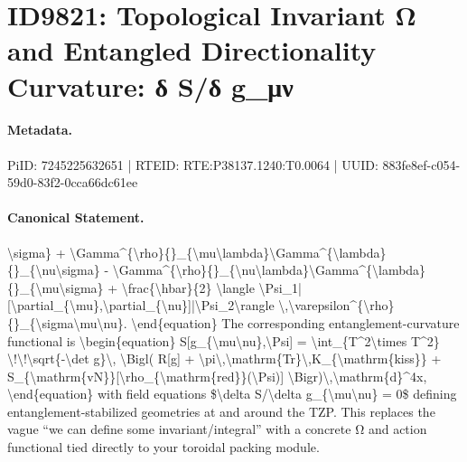 \section*{ID9821: Topological Invariant Ω and Entangled Directionality Curvature: δ S/δ g\_μν}
\paragraph{Metadata.}
PiID: 7245225632651 | RTEID: RTE:P38137.1240:T0.0064 | UUID: 883fe8ef-c054-59d0-83f2-0cca66dc61ee

\paragraph{Canonical Statement.}
\textbackslash{}sigma\} + \textbackslash{}Gamma\textasciicircum{}\{\textbackslash{}rho\}\{\}\_\{\textbackslash{}mu\textbackslash{}lambda\}\textbackslash{}Gamma\textasciicircum{}\{\textbackslash{}lambda\}\{\}\_\{\textbackslash{}nu\textbackslash{}sigma\} - \textbackslash{}Gamma\textasciicircum{}\{\textbackslash{}rho\}\{\}\_\{\textbackslash{}nu\textbackslash{}lambda\}\textbackslash{}Gamma\textasciicircum{}\{\textbackslash{}lambda\}\{\}\_\{\textbackslash{}mu\textbackslash{}sigma\} + \textbackslash{}frac\{\textbackslash{}hbar\}\{2\} \textbackslash{}langle \textbackslash{}Psi\_1|[\textbackslash{}partial\_\{\textbackslash{}mu\},\textbackslash{}partial\_\{\textbackslash{}nu\}]|\textbackslash{}Psi\_2\textbackslash{}rangle \textbackslash{},\textbackslash{}varepsilon\textasciicircum{}\{\textbackslash{}rho\}\{\}\_\{\textbackslash{}sigma\textbackslash{}mu\textbackslash{}nu\}. \textbackslash{}end\{equation\} The corresponding entanglement-curvature functional is \textbackslash{}begin\{equation\} S[g\_\{\textbackslash{}mu\textbackslash{}nu\},\textbackslash{}Psi] = \textbackslash{}int\_\{T\textasciicircum{}2\textbackslash{}times T\textasciicircum{}2\} \textbackslash{}!\textbackslash{}!\textbackslash{}sqrt\{-\textbackslash{}det g\}\textbackslash{}, \textbackslash{}Bigl( R[g] + \textbackslash{}pi\textbackslash{},\textbackslash{}mathrm\{Tr\}\textbackslash{},K\_\{\textbackslash{}mathrm\{kiss\}\} + S\_\{\textbackslash{}mathrm\{vN\}\}[\textbackslash{}rho\_\{\textbackslash{}mathrm\{red\}\}(\textbackslash{}Psi)] \textbackslash{}Bigr)\textbackslash{},\textbackslash{}mathrm\{d\}\textasciicircum{}4x, \textbackslash{}end\{equation\} with field equations \$\textbackslash{}delta S/\textbackslash{}delta g\_\{\textbackslash{}mu\textbackslash{}nu\} = 0\$ defining entanglement-stabilized geometries at and around the TZP. This replaces the vague “we can define some invariant/integral” with a concrete Ω and action functional tied directly to your toroidal packing module.

